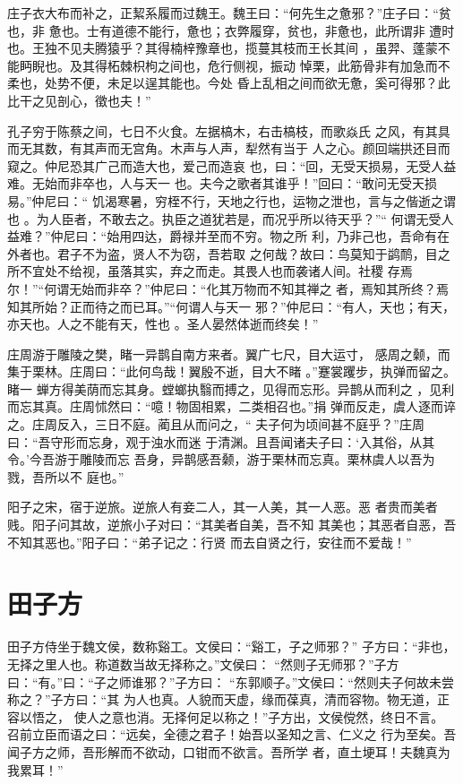 \documentclass[12pt,UTF8]{ctexbook}
\begin{document}
庄子衣大布而补之，正絜系履而过魏王。魏王曰：“何先生之惫邪？”庄子曰：“贫也，非 惫也。士有道德不能行，惫也；衣弊履穿，贫也，非惫也，此所谓非 遭时也。王独不见夫腾猿乎？其得楠梓豫章也，揽蔓其枝而王长其间 ，虽羿、蓬蒙不能眄睨也。及其得柘棘枳枸之间也，危行侧视，振动 悼栗，此筋骨非有加急而不柔也，处势不便，未足以逞其能也。今处 昏上乱相之间而欲无惫，奚可得邪？此比干之见剖心，徵也夫！”

孔子穷于陈蔡之间，七日不火食。左据槁木，右击槁枝，而歌焱氏 之风，有其具而无其数，有其声而无宫角。木声与人声，犁然有当于 人之心。颜回端拱还目而窥之。仲尼恐其广己而造大也，爱己而造哀 也，曰：“回，无受天损易，无受人益难。无始而非卒也，人与天一 也。夫今之歌者其谁乎！”回曰：“敢问无受天损易。”仲尼曰：“ 饥渴寒暑，穷桎不行，天地之行也，运物之泄也，言与之偕逝之谓也 。为人臣者，不敢去之。执臣之道犹若是，而况乎所以待天乎？”“ 何谓无受人益难？”仲尼曰：“始用四达，爵禄并至而不穷。物之所 利，乃非己也，吾命有在外者也。君子不为盗，贤人不为窃，吾若取 之何哉？故曰：鸟莫知于鹢鸸，目之 所不宜处不给视，虽落其实，弃之而走。其畏人也而袭诸人间。社稷 存焉尔！”“何谓无始而非卒？”仲尼曰：“化其万物而不知其禅之 者，焉知其所终？焉知其所始？正而待之而已耳。”“何谓人与天一 邪？”仲尼曰：“有人，天也；有天，亦天也。人之不能有天，性也 。圣人晏然体逝而终矣！”

庄周游于雕陵之樊，睹一异鹊自南方来者。翼广七尺，目大运寸， 感周之颡，而集于栗林。庄周曰：“此何鸟哉！翼殷不逝，目大不睹 。”蹇裳躩步，执弹而留之。睹一 蝉方得美荫而忘其身。螳螂执翳而搏之，见得而忘形。异鹊从而利之 ，见利而忘其真。庄周怵然曰：“噫！物固相累，二类相召也。”捐 弹而反走，虞人逐而谇之。庄周反入，三日不庭。蔺且从而问之，“ 夫子何为顷间甚不庭乎？”庄周曰：“吾守形而忘身，观于浊水而迷 于清渊。且吾闻诸夫子曰：‘入其俗，从其令。’今吾游于雕陵而忘 吾身，异鹊感吾颡，游于栗林而忘真。栗林虞人以吾为戮，吾所以不 庭也。”

阳子之宋，宿于逆旅。逆旅人有妾二人，其一人美，其一人恶。恶 者贵而美者贱。阳子问其故，逆旅小子对曰：“其美者自美，吾不知 其美也；其恶者自恶，吾不知其恶也。”阳子曰：“弟子记之：行贤 而去自贤之行，安往而不爱哉！”
\section{田子方}

田子方侍坐于魏文侯，数称谿工。文侯曰：“谿工，子之师邪？” 子方曰：“非也，无择之里人也。称道数当故无择称之。”文侯曰： “然则子无师邪？”子方曰：“有。”曰：“子之师谁邪？”子方曰： “东郭顺子。”文侯曰：“然则夫子何故未尝称之？”子方曰：“其 为人也真。人貌而天虚，缘而葆真，清而容物。物无道，正容以悟之， 使人之意也消。无择何足以称之！”子方出，文侯傥然，终日不言。 召前立臣而语之曰：“远矣，全德之君子！始吾以圣知之言、仁义之 行为至矣。吾闻子方之师，吾形解而不欲动，口钳而不欲言。吾所学 者，直土埂耳！夫魏真为我累耳！”
\end{document}
